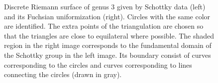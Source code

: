 \documentclass[Thesis]{subfiles}
\begin{document}
\begin{figure}
  \centering
  \caption{Discrete Riemann surface of genus $3$ given by Schottky
    data (left) and its Fuchsian uniformization (right). Circles with
    the same color are identified. The extra points of the
    triangulation are chosen so that the triangles are close to
    equilateral where possible. The shaded region in the right image
    corresponds to the fundamental domain of the Schottky group in the
    left image. Its boundary consist of curves corresponding to the
    circles and curves corresponding to lines connecting the circles
    (drawn in gray).}
  \label{fig:schottky_g3}
\end{figure}


\end{document}
